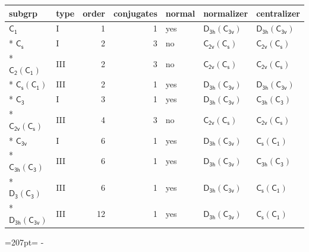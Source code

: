\documentclass[10pt,a4paper]{article}
\newcommand{\needspace}[1]{\par\penalty-100\begingroup\dimen0=#1\relax\dimen2=\pagegoal
  \advance\dimen2-\pagetotal\ifdim\dimen0>\dimen2\relax\ifdim\dimen2>0pt\vfil\break\fi\fi
  \endgroup}
\numberwithin{equation}{section}
\newcommand{\grp}[1]{\mathsf{#1}}
\begin{document}
{\small\begin{longtable}{@{}llrrlll@{}}\toprule
subgrp & type & order & conjugates & normal & normalizer & centralizer\\\midrule\endhead
\bottomrule\endfoot\endlastfoot
\href{../../../rotation/data/pdf/C1.pdf}{$\grp{C_{1}}$} & I & 1 & 1 & yes & \href{D3h-C3v.pdf}{$\grp{D_{3h}}(\grp{C_{3v}})$} & \href{D3h-C3v.pdf}{$\grp{D_{3h}}(\grp{C_{3v}})$}\\*
\href{../../../rotation/data/pdf/C1v.pdf}{$\grp{C_{s}}$} & I & 2 & 3 & no & \href{C2v-C1v.pdf}{$\grp{C_{2v}}(\grp{C_{s}})$} & \href{C2v-C1v.pdf}{$\grp{C_{2v}}(\grp{C_{s}})$}\\*
\href{C2-C1.pdf}{$\grp{C_{2}}(\grp{C_{1}})$} & III & 2 & 3 & no & \href{C2v-C1v.pdf}{$\grp{C_{2v}}(\grp{C_{s}})$} & \href{C2v-C1v.pdf}{$\grp{C_{2v}}(\grp{C_{s}})$}\\*
\href{C1v-C1.pdf}{$\grp{C_{s}}(\grp{C_{1}})$} & III & 2 & 1 & yes & \href{D3h-C3v.pdf}{$\grp{D_{3h}}(\grp{C_{3v}})$} & \href{D3h-C3v.pdf}{$\grp{D_{3h}}(\grp{C_{3v}})$}\\*
\href{../../../rotation/data/pdf/C3.pdf}{$\grp{C_{3}}$} & I & 3 & 1 & yes & \href{D3h-C3v.pdf}{$\grp{D_{3h}}(\grp{C_{3v}})$} & \href{C3h-C3.pdf}{$\grp{C_{3h}}(\grp{C_{3}})$}\\*
\href{C2v-C1v.pdf}{$\grp{C_{2v}}(\grp{C_{s}})$} & III & 4 & 3 & no & \href{C2v-C1v.pdf}{$\grp{C_{2v}}(\grp{C_{s}})$} & \href{C2v-C1v.pdf}{$\grp{C_{2v}}(\grp{C_{s}})$}\\*
\href{../../../rotation/data/pdf/C3v.pdf}{$\grp{C_{3v}}$} & I & 6 & 1 & yes & \href{D3h-C3v.pdf}{$\grp{D_{3h}}(\grp{C_{3v}})$} & \href{C1v-C1.pdf}{$\grp{C_{s}}(\grp{C_{1}})$}\\*
\href{C3h-C3.pdf}{$\grp{C_{3h}}(\grp{C_{3}})$} & III & 6 & 1 & yes & \href{D3h-C3v.pdf}{$\grp{D_{3h}}(\grp{C_{3v}})$} & \href{C3h-C3.pdf}{$\grp{C_{3h}}(\grp{C_{3}})$}\\*
\href{D3-C3.pdf}{$\grp{D_{3}}(\grp{C_{3}})$} & III & 6 & 1 & yes & \href{D3h-C3v.pdf}{$\grp{D_{3h}}(\grp{C_{3v}})$} & \href{C1v-C1.pdf}{$\grp{C_{s}}(\grp{C_{1}})$}\\*
\href{D3h-C3v.pdf}{$\grp{D_{3h}}(\grp{C_{3v}})$} & III & 12 & 1 & yes & \href{D3h-C3v.pdf}{$\grp{D_{3h}}(\grp{C_{3v}})$} & \href{C1v-C1.pdf}{$\grp{C_{s}}(\grp{C_{1}})$}\\
\bottomrule\end{longtable}}
\needspace{207pt}
\end{document}

